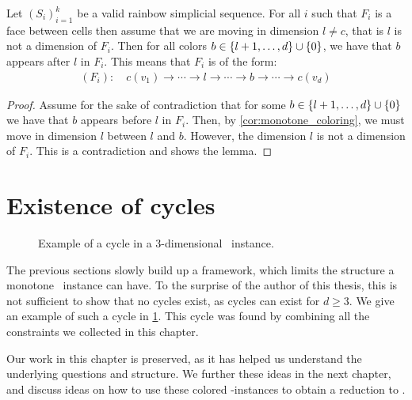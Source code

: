 \begin{lemma}\label{lem:ordering_of_vertices_in_transition_faces}
	Let ${\left(S_i\right)}_{i=1}^k$ be a valid rainbow simplicial sequence. For all $i$ such that $F_i$ is a face between cells then assume that we are moving in dimension $l \neq c$, that is $l$ is not a dimension of $F_i$. Then for all colors $b \in \left\{l+1, \dots, d\right\} \cup \left\{0\right\}$, we have that $b$ appears after $l$ in $F_i$. This means that $F_i$ is of the form:
	\begin{align*}
		(F_i): \quad c(v_1) \xrightarrow{} \cdots \xrightarrow{} l \xrightarrow{} \cdots \xrightarrow{} b \xrightarrow{} \cdots \xrightarrow{} c(v_d)
	\end{align*}
\end{lemma}
\begin{proof}
	Assume for the sake of contradiction that for some ${b \in \left\{l+1, \dots, d\right\} \cup \left\{0\right\}}$ we have that $b$ appears before $l$ in $F_i$. Then, by \cref{cor:monotone_coloring}, we must move in dimension $l$ between $l$ and $b$. However, the dimension $l$ is not a dimension of $F_i$. This is a contradiction and shows the lemma.
\end{proof}

\section{Existence of cycles}\label{sec:existence_of_cycles}

\begin{figure}
	\centering
	\caption[Example of a 3D cycle]{Example of a cycle in a 3-dimensional \Tarskistar\ instance.}\label{fig:cycle_example}
\end{figure}

The previous sections slowly build up a framework, which limits the structure a monotone \Tarski\ instance can have. To the surprise of the author of this thesis, this is not sufficient to show that no cycles exist, as cycles can exist for $d \geq 3$. We give an example of such a cycle in \cref{fig:cycle_example}. This cycle was found by combining all the constraints we collected in this chapter.

Our work in this chapter is preserved, as it has helped us understand the underlying questions and structure. We further these ideas in the next chapter, and discuss ideas on how to use these colored \Tarskistar-instances to obtain a reduction to \EndOfPotentialLine\@.

